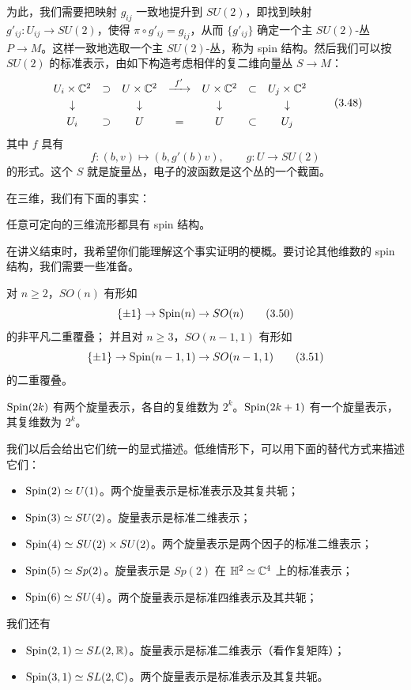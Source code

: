 为此，我们需要把映射 $g_{ij}$ 一致地提升到 $SU(2)$，即找到映射 $g'_{ij}:U_{ij}\to SU(2)$，使得 $\pi\circ g'_{ij}=g_{ij}$，从而 $\{g'_{ij}\}$ 确定一个主 $SU(2)$-丛 $P\to M$。这样一致地选取一个主 $SU(2)$-丛，称为 spin 结构。然后我们可以按 $SU(2)$ 的标准表示，由如下构造考虑相伴的复二维向量丛 $S\to M$：
{\small\setlength{\arraycolsep}{4pt}
\[
\begin{array}{ccccccc}
U_i\times\mathbb{C}^2 & \supset & U\times\mathbb{C}^2 & \xrightarrow{\ f'\ } & U\times\mathbb{C}^2 & \subset & U_j\times\mathbb{C}^2\\[3pt]
\downarrow & & \downarrow & & \downarrow & & \downarrow\\[3pt]
U_i & \supset & U & = & U & \subset & U_j
\end{array}
\tag{3.48}
\]
}
其中 $f$ 具有
\[
f:(b,v)\mapsto(b,g'(b)v),\qquad g:U\to SU(2)
\tag{3.49}
\]
的形式。这个 $S$ 就是旋量丛，电子的波函数是这个丛的一个截面。

在三维，我们有下面的事实：

\begin{qmbox}
 任意可定向的三维流形都具有 spin 结构。
\end{qmbox}

在讲义结束时，我希望你们能理解这个事实证明的梗概。要讨论其他维数的 spin 结构，我们需要一些准备。

\begin{qmbox}
 对 $n\ge2$，$SO(n)$ 有形如
\[
\{\pm1\}\to \mathrm{Spin}(n)\to SO(n)
\tag{3.50}
\]
的非平凡二重覆叠；
并且对 $n\ge3$，$SO(n-1,1)$ 有形如
\[
\{\pm1\}\to \mathrm{Spin}(n-1,1)\to SO(n-1,1)
\tag{3.51}
\]
的二重覆叠。
\end{qmbox}

\begin{qmbox}
 $\mathrm{Spin}(2k)$ 有两个旋量表示，各自的复维数为 $2^k$。$\mathrm{Spin}(2k+1)$ 有一个旋量表示，其复维数为 $2^k$。
\end{qmbox}

我们以后会给出它们统一的显式描述。低维情形下，可以用下面的替代方式来描述它们：
\begin{itemize}
  \item $\mathrm{Spin}(2)\simeq U(1)$。两个旋量表示是标准表示及其复共轭；
  \item $\mathrm{Spin}(3)\simeq SU(2)$。旋量表示是标准二维表示；
  \item $\mathrm{Spin}(4)\simeq SU(2)\times SU(2)$。两个旋量表示是两个因子的标准二维表示；
  \item $\mathrm{Spin}(5)\simeq Sp(2)$。旋量表示是 $Sp(2)$ 在 $\mathbb{H}^2\simeq\mathbb{C}^4$ 上的标准表示；
  \item $\mathrm{Spin}(6)\simeq SU(4)$。两个旋量表示是标准四维表示及其共轭；
\end{itemize}
我们还有
\begin{itemize}
  \item $\mathrm{Spin}(2,1)\simeq SL(2,\mathbb{R})$。旋量表示是标准二维表示（看作复矩阵）；
  \item $\mathrm{Spin}(3,1)\simeq SL(2,\mathbb{C})$。两个旋量表示是标准表示及其复共轭。
\end{itemize}

